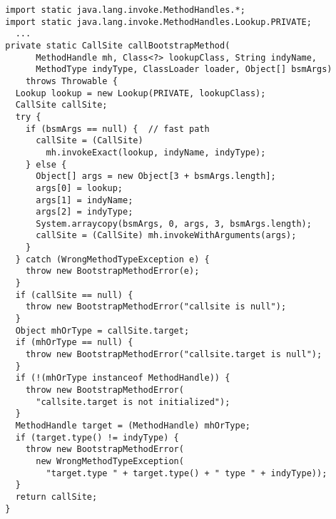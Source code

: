 {\scriptsize \begin{verbatim}
  import static java.lang.invoke.MethodHandles.*;
  import static java.lang.invoke.MethodHandles.Lookup.PRIVATE;
    ...
  private static CallSite callBootstrapMethod(
        MethodHandle mh, Class<?> lookupClass, String indyName,
        MethodType indyType, ClassLoader loader, Object[] bsmArgs)
      throws Throwable {
    Lookup lookup = new Lookup(PRIVATE, lookupClass);
    CallSite callSite;
    try {
      if (bsmArgs == null) {  // fast path
        callSite = (CallSite)
          mh.invokeExact(lookup, indyName, indyType);
      } else {
        Object[] args = new Object[3 + bsmArgs.length];
        args[0] = lookup;
        args[1] = indyName;
        args[2] = indyType;
        System.arraycopy(bsmArgs, 0, args, 3, bsmArgs.length);
        callSite = (CallSite) mh.invokeWithArguments(args);
      }
    } catch (WrongMethodTypeException e) {
      throw new BootstrapMethodError(e);
    }
    if (callSite == null) {
      throw new BootstrapMethodError("callsite is null");
    }
    Object mhOrType = callSite.target;
    if (mhOrType == null) {
      throw new BootstrapMethodError("callsite.target is null");
    }
    if (!(mhOrType instanceof MethodHandle)) {
      throw new BootstrapMethodError(
        "callsite.target is not initialized");
    }
    MethodHandle target = (MethodHandle) mhOrType;
    if (target.type() != indyType) {
      throw new BootstrapMethodError(
        new WrongMethodTypeException(
          "target.type " + target.type() + " type " + indyType));
    }
    return callSite;
  }
\end{verbatim} }
